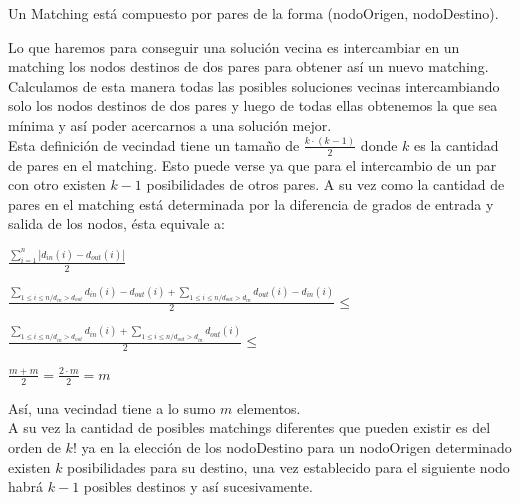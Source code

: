 \documentclass[11pt, a4paper, spanish]{article}
\begin{document}
Un Matching est\'a compuesto por pares de la forma (nodoOrigen, nodoDestino).

Lo que haremos para conseguir una soluci\'on vecina es intercambiar en un matching los nodos destinos de dos pares para obtener as\'i un nuevo matching. Calculamos de esta manera todas las posibles soluciones vecinas intercambiando solo los nodos destinos de dos pares y luego de todas ellas obtenemos la que sea m\'inima y as\'i poder acercarnos a una soluci\'on mejor.\\

Esta definici\'on de vecindad tiene un tama\~{n}o de $\frac{k \cdot (k-1)}{2}$ donde $k$ es la cantidad de pares en el matching. Esto puede verse ya que para el intercambio de un par con otro existen $k-1$ posibilidades de otros pares. A su vez como la cantidad de pares en el matching est\'a determinada por la diferencia de grados de entrada y salida de los nodos, \'esta equivale a:\\


\begin{center}
	$\displaystyle{\frac{\displaystyle\sum_{i=1}^{n}{|d_{in}(i)-d_{out}(i)|}}{2}}$\\
\end{center}

\begin{center}
	$\displaystyle{\frac{\displaystyle\sum_{1 \leq i \leq n / d_{in} > d_{out}}^{}{d_{in}(i)-d_{out}(i)} + \displaystyle\sum_{1 \leq i \leq n / d_{out} > d_{in}}^{}{d_{out}(i)-d_{in}(i)} }{2}} \leq$\\
\end{center}

\begin{center}
	$\displaystyle{\frac{\displaystyle\sum_{1 \leq i \leq n / d_{in} > d_{out}}^{}{d_{in}(i)} + \displaystyle\sum_{1 \leq i \leq n / d_{out} > d_{in}}^{}{d_{out}(i)} }{2}} \leq $\\
\end{center}

\begin{center}
	$\displaystyle{\frac{m + m}{2} = \frac{2 \cdot m}{2} = m} $\\
\end{center}

As\'i, una vecindad tiene a lo sumo $m$ elementos.\\

A su vez la cantidad de posibles matchings diferentes que pueden existir es del orden de $k!$ ya en la elecci\'on de los nodoDestino para un nodoOrigen determinado existen $k$ posibilidades para su destino, una vez establecido para el siguiente nodo habr\'a $k-1$ posibles destinos y as\'i sucesivamente.
\end{document}
